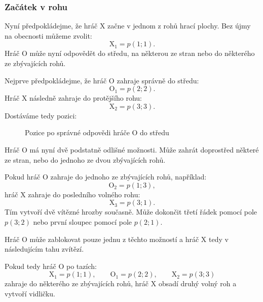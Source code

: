 \documentclass[12pt,a4paper]{article}
\begin{document}
\subsubsection*{Začátek v rohu}
Nyní předpokládejme, že hráč $\mathrm{X}$ začne v jednom z rohů hrací plochy.
Bez újmy na obecnosti můžeme zvolit:
\[
    \mathrm{X}_1=p(1;1).
\]
Hráč $\mathrm{O}$ může nyní odpovědět do středu, 
na některou ze stran nebo do některého ze zbývajících rohů.

Nejprve předpokládejme, že hráč $\mathrm{O}$ zahraje správně do středu:
\[
    \mathrm{O}_1=p(2;2).
\]
Hráč $\mathrm{X}$ následně zahraje do protějšího rohu:
\[
    \mathrm{X}_2=p(3;3).
\]
Dostáváme tedy pozici:
\begin{figure}[h]
    \begin{center}
    \end{center}

    \caption{Pozice po správné odpovědi hráče $\mathrm{O}$ do středu}
    \label{fig:TicTacToeStrategieXRohStred}
\end{figure}

Hráč $\mathrm{O}$ má nyní dvě podstatně odlišné možnosti.
Může zahrát doprostřed některé ze stran, nebo do jednoho ze dvou zbývajících rohů.

Pokud hráč $\mathrm{O}$ zahraje do jednoho ze zbývajících rohů, například:
\[
    \mathrm{O}_2=p(1;3),
\]
hráč $\mathrm{X}$ zahraje do posledního volného rohu:
\[
    \mathrm{X}_3=p(3;1).
\]
Tím vytvoří dvě vítězné hrozby současně.
Může dokončit třetí řádek pomocí pole $p(3;2)$ nebo první sloupec pomocí pole $p(2;1)$.

Hráč $\mathrm{O}$ může zablokovat pouze jednu z těchto možností 
a hráč $\mathrm{X}$ tedy v následujícím tahu zvítězí.

Pokud tedy hráč $\mathrm{O}$ po tazích:
\[
    \mathrm{X}_1=p(1;1),\qquad
    \mathrm{O}_1=p(2;2),\qquad
    \mathrm{X}_2=p(3;3)
\]
zahraje do některého ze zbývajících rohů, hráč $\mathrm{X}$ obsadí druhý volný roh 
a vytvoří vidličku.
\end{document}
